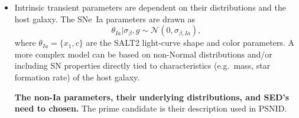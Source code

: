 \documentclass[preprint,3p]{elsarticle}
\begin{document}
\begin{itemize}
\item Intrinsic transient parameters are dependent on their distributions and the host galaxy.
The SNe~Ia parameters are drawn as
\begin{equation}
\theta_{Ia} | \sigma_\beta, g \sim \mathcal{N}(0, \sigma_{\beta,Ia}),
\end{equation}
where $\theta_{Ia} =\{x_1, c\}$ are the SALT2 light-curve shape and color parameters.
A more complex model can be based on non-Normal distributions
and/or including SN properties directly tied to characteristics (e.g.\ mass, star formation
rate) of the host galaxy.

{\bf The non-Ia parameters, their underlying distributions, and SED's need to chosen.}
The prime candidate
is their description used in PSNID.


\end{itemize}
\end{document}

